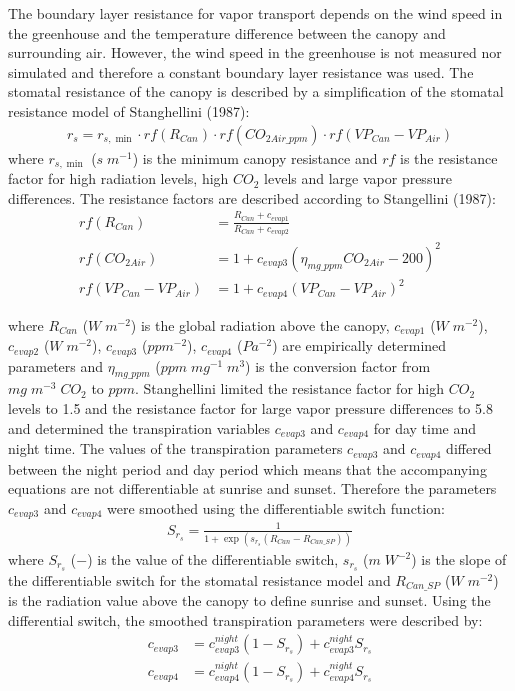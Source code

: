 \documentclass[a4paper]{article}
\begin{document}
The boundary layer resistance for vapor transport depends on the wind speed in the greenhouse and the temperature difference between the canopy and surrounding air\cite{stanghellini1987transpiration}.
However, the wind speed in the greenhouse is not measured nor simulated and therefore a constant boundary layer resistance was used.
The stomatal resistance of the canopy is described by a simplification of the stomatal resistance model of Stanghellini (1987):
\begin{align}
  r_s = r_{s,\min} \cdot rf(R_{Can}) \cdot rf(CO_{2Air\_ppm}) \cdot rf(VP_{Can} - VP_{Air})
\end{align}
where \(r_{s,\min}\) (\(s\;m^{-1}\)) is the minimum canopy resistance and \(rf\) is the resistance factor for high radiation levels, high \(CO_2\) levels and large vapor pressure differences.
The resistance factors are described according to Stangellini (1987):
\begin{equation}
  \begin{split}
    rf(R_{Can}) & = \frac{R_{Can} + c_{evap1}}{R_{Can} + c_{evap2}} \\
    rf(CO_{2Air}) & = 1 + {c_{evap3} (\eta_{mg\_ppm} CO_{2Air} - 200)}^2 \\
    rf(VP_{Can} - VP_{Air}) & = 1 + {c_{evap4} (VP_{Can} - VP_{Air})}^2
  \end{split}
\end{equation}

where \(R_{Can}\) (\(W\;m^{-2}\)) is the global radiation above the canopy, \(c_{evap1}\) (\(W\;m^{-2}\)), \(c_{evap2}\) (\(W\;m^{-2}\)), \(c_{evap3}\) (\(ppm^{-2}\)), \(c_{evap4}\) (\(Pa^{-2}\)) are empirically determined parameters and \(\eta_{mg\_ppm}\) (\(ppm\;mg^{-1}\;m^3\)) is the conversion factor from \(mg\;m^{-3}\;CO_2\) to \(ppm\).
Stanghellini limited the resistance factor for high \(CO_2\) levels to 1.5 and the resistance factor for large vapor pressure differences to 5.8 and determined the transpiration variables \(c_{evap3}\) and \(c_{evap4}\) for day time and night time.
The values of the transpiration parameters \(c_{evap3}\) and \(c_{evap4}\) differed between the night period and day period which means that the accompanying equations are not differentiable at sunrise and sunset. Therefore the parameters \(c_{evap3}\) and \(c_{evap4}\) were smoothed using the differentiable switch function:
\begin{align}
  S_{r_s} = \frac{1}{1 + \exp \left(s_{r_s} (R_{Can} - R_{Can\_SP})\right)}
\end{align}
where \(S_{r_s}\) (\(-\)) is the value of the differentiable switch, \(s_{r_s}\) (\(m\;W^{-2}\)) is the slope of the differentiable switch for the stomatal resistance model and \(R_{Can\_SP}\) (\(W\;m^{-2}\)) is the radiation value above the canopy to define sunrise and sunset.
Using the differential switch, the smoothed transpiration parameters were described by:
\begin{align}
  c_{evap3} & = c_{evap3}^{night} (1 - S_{r_s}) + c_{evap3}^{night} S_{r_s} \\
  c_{evap4} & = c_{evap4}^{night} (1 - S_{r_s}) + c_{evap4}^{night} S_{r_s}
\end{align}
\end{document}
